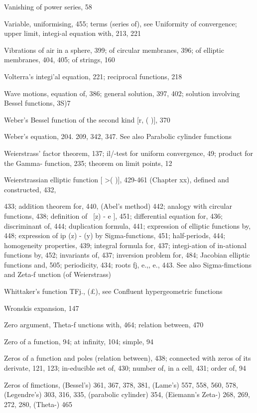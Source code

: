 Vanishing of power series, 58

Variable, uniformising, 455; terms (series of), see Uniformity of convergence; upper limit,
integi-al equation with, 213, 221

Vibrations of air in a sphere, 399; of circular membranes, 396; of elliptic membranes, 404, 405;
of strings, 160

Volterra's integi'al equation, 221; reciprocal functions, 218

Wave motions, equation of, 386; general solution, 397, 402; solution involving Bessel functions,
3S)7

Weber's Bessel function of the second kind [r, ( )], 370

Weber's equation, 204. 209, 342, 347. See also Parabolic cylinder functions

Weierstrass' factor theorem, 137; il/-test for uniform convergence, 49; product for the Gamma-
function, 235; theorem on limit points, 12

Weierstrassian elliptic function [  >( )], 429-461 (Chapter xx), defined and constructed, 432,

433; addition theorem for, 440, (Abel's method) 442; analogy with circular functions,
438; definition of \   [z) - e ], 451; differential equation for, 436; discriminant of, 444;
duplication formula, 441; expression of elliptic functions by, 448; expression of ip (z) -   (y)
by Sigma-functions, 451; half-periods, 444; homogeneity properties, 439; integral formula
for, 437; integi-ation of in-ational functions by, 452; invariants of, 437; inversion problem
for, 484; Jacobian elliptic functions and, 505; periodicity, 434; roots fj, e.,, e., 443. See
also Sigma-fimctions and Zeta-f unction (of Weierstrass)

Whittaker's function TFj., (£), see Confluent hypergeometric functions

Wronskis expansion, 147

Zero argument, Theta-f unctions with, 464; relation between, 470

Zero of a function, 94; at infinity, 104; simple, 94

Zeros of a function and poles (relation between), 438; connected with zeros of its derivate, 121,
123; in-educible set of, 430; number of, in a cell, 431; order of, 94

Zeros of fimctions, (Bessel's) 361, 367, 378, 381, (Lame's) 557, 558, 560, 578, (Legendre's) 303,
316, 335, (parabolic cylinder) 354, (Eiemann's Zeta-) 268, 269, 272, 280, (Theta-) 465

